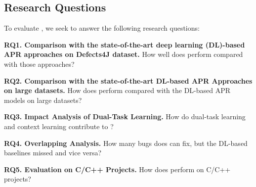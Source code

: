\subsection{Research Questions}

To evaluate {\tool}, we seek to answer the following research questions:

\noindent\textbf{RQ1. Comparison with the state-of-the-art deep learning
  (DL)-based APR approaches on Defects4J dataset.}  How well does
                {\tool} perform compared with those approaches?



\noindent\textbf{RQ2. Comparison with the state-of-the-art DL-based APR Approaches on large datasets.}  
How does {\tool} perform compared with the DL-based APR models on large datasets?




\noindent\textbf{RQ3. Impact Analysis of Dual-Task Learning.} How do
dual-task learning and context learning contribute to {\tool}?

\noindent\textbf{RQ4. Overlapping Analysis.} How many bugs does
                {\tool} can fix, but the DL-based baselines missed and
                vice versa?

\noindent\textbf{RQ5. Evaluation on C/C++ Projects.} How does {\tool} perform on C/C++ projects?

